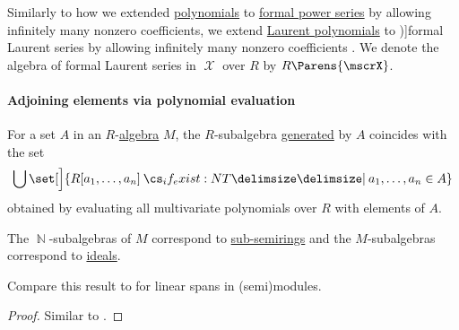 \begin{definition}\label{def:formal_laurent_series}
  Similarly to how we extended \hyperref[def:polynomial_algebra/polynomials]{polynomials} to \hyperref[def:formal_power_series]{formal power series} by allowing infinitely many nonzero coefficients, we extend \hyperref[def:laurent_polynomial_algebra]{Laurent polynomials} to \term[ru=формальные ряды Лорана (\cite[23]{Шафаревич1999})]{formal Laurent series} by allowing infinitely many nonzero coefficients . We denote the algebra of formal Laurent series in \( \mscrX \) over \( R \) by \( R\Parens{\mscrX} \).
\end{definition}

\paragraph{Adjoining elements via polynomial evaluation}

\begin{proposition}\label{thm:generators_via_polynomials}
  For a set \( A \) in an \( R \)-\hyperref[def:algebra_over_semiring]{algebra} \( M \), the \( R \)-subalgebra \hyperref[def:algebra_over_semiring/generated]{generated} by \( A \) coincides with the set
  \begin{equation*}
    \bigcup \set[\Big]{ R[a_1, \ldots, a_n] \given* a_1, \ldots, a_n \in A }
  \end{equation*}
  obtained by evaluating all multivariate polynomials over \( R \) with elements of \( A \).
\end{proposition}
\begin{comments}
  \item The \( \BbbN \)-subalgebras of \( M \) correspond to \hyperref[def:semiring/submodel]{sub-semirings} and the \( M \)-subalgebras correspond to \hyperref[def:semiring_ideal]{ideals}.

  \item Compare this result to  for linear spans in (semi)modules.
\end{comments}
\begin{proof}
  Similar to .
\end{proof}

